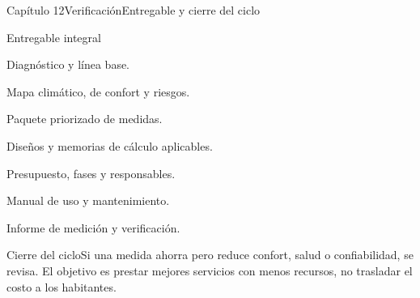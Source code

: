 \documentclass{../plantilla/hvtbook}
\begin{document}
\begin{HVTPage}{Capítulo 12}{Verificación}{Entregable y cierre del ciclo}
\begin{HVTTask}{Entregable integral}\item Diagnóstico y línea base. \item Mapa climático, de confort y riesgos. \item Paquete priorizado de medidas. \item Diseños y memorias de cálculo aplicables. \item Presupuesto, fases y responsables. \item Manual de uso y mantenimiento. \item Informe de medición y verificación.\end{HVTTask}
\begin{HVTWarning}{Cierre del ciclo}Si una medida ahorra pero reduce confort, salud o confiabilidad, se revisa. El objetivo es prestar mejores servicios con menos recursos, no trasladar el costo a los habitantes.\end{HVTWarning}
\end{HVTPage}
\end{document}
